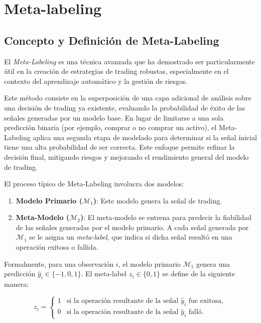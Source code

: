 \documentclass[a4paper,12pt, twoside]{report}
\begin{document}
\chapter{Meta-labeling}

\section{Concepto y Definición de Meta-Labeling}


El \textit{Meta-Labeling} es una técnica avanzada que ha demostrado ser particularmente útil
en la creación de estrategias de trading robustas, especialmente en el contexto del aprendizaje
automático y la gestión de riesgos. 

Este método consiste en la superposición de una capa
adicional de análisis sobre una decisión de trading ya existente, evaluando la probabilidad 
de éxito de las señales generadas por un modelo base. En lugar de limitarse
a una sola predicción binaria (por ejemplo, comprar o no comprar un activo), el Meta-
Labeling aplica una segunda etapa de modelado para determinar si la señal inicial tiene
una alta probabilidad de ser correcta. Este enfoque permite refinar la decisión final,
mitigando riesgos y mejorando el rendimiento general del modelo de trading.

El proceso típico de Meta-Labeling involucra dos modelos:
\begin{enumerate}
    \item \textbf{Modelo Primario ($\mathcal{M}_1$)}: Este modelo genera la señal de 
    trading.
    \item \textbf{Meta-Modelo ($\mathcal{M}_2$)}: El meta-modelo se entrena para 
    predecir la fiabilidad de las señales generadas por el modelo primario. A cada 
    señal generada por $\mathcal{M}_1$ se le asigna un \textit{meta-label}, que 
    indica si dicha señal resultó en una operación exitosa o fallida.
\end{enumerate}

Formalmente, para una observación $i$, el modelo primario $\mathcal{M}_1$ genera 
una predicción $\hat{y}_i \in \{-1, 0, 1\}$. El meta-label $z_i \in \{0, 1\}$ se 
define de la siguiente manera:

\[
z_i = \begin{cases} 
1 & \text{si la operación resultante de la señal } \hat{y}_i \text{ fue exitosa}, \\
0 & \text{si la operación resultante de la señal } \hat{y}_i \text{ falló}.
\end{cases}
\]
\end{document}
